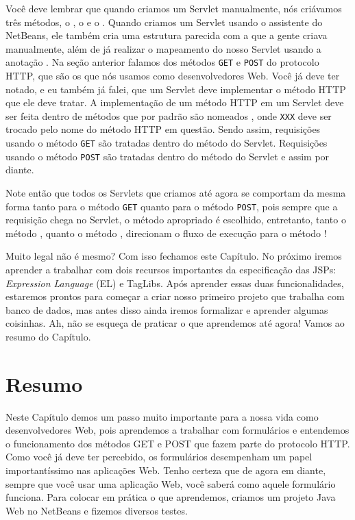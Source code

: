 Você deve lembrar que quando criamos um Servlet manualmente, nós criávamos três métodos, o , o  e o . Quando criamos um Servlet usando o assistente do NetBeans, ele também cria uma estrutura parecida com a que a gente criava manualmente, além de já realizar o mapeamento do nosso Servlet usando a anotação . Na seção anterior falamos dos métodos \texttt{GET} e \texttt{POST} do protocolo HTTP, que são os que nós usamos como desenvolvedores Web. Você já deve ter notado, e eu também já falei, que um Servlet deve implementar o método HTTP que ele deve tratar. A implementação de um método HTTP em um Servlet deve ser feita dentro de métodos que por padrão são nomeados , onde \texttt{XXX} deve ser trocado pelo nome do método HTTP em questão. Sendo assim, requisições usando o método \texttt{GET} são tratadas dentro do método  do Servlet. Requisições usando o método \texttt{POST} são tratadas dentro do método  do Servlet e assim por diante.

Note então que todos os Servlets que criamos até agora se comportam da mesma forma tanto para o método \texttt{GET} quanto para o método \texttt{POST}, pois sempre que a requisição chega no Servlet, o método apropriado é escolhido, entretanto, tanto o método , quanto o método , direcionam o fluxo de execução para o método !
 
Muito legal não é mesmo? Com isso fechamos este Capítulo. No próximo iremos aprender a trabalhar com dois recursos importantes da especificação das JSPs: \textit{Expression Language} (EL) e TagLibs. Após aprender essas duas funcionalidades, estaremos prontos para começar a criar nosso primeiro projeto que trabalha com banco de dados, mas antes disso ainda iremos formalizar e aprender algumas coisinhas. Ah, não se esqueça de praticar o que aprendemos até agora! Vamos ao resumo do Capítulo.


\section{Resumo}

Neste Capítulo demos um passo muito importante para a nossa vida como desenvolvedores Web, pois aprendemos a trabalhar com formulários e entendemos o funcionamento dos métodos GET e POST que fazem parte do protocolo HTTP. Como você já deve ter percebido, os formulários desempenham um papel importantíssimo nas aplicações Web. Tenho certeza que de agora em diante, sempre que você usar uma aplicação Web, você saberá como aquele formulário funciona. Para colocar em prática o que aprendemos, criamos um projeto Java Web no NetBeans e fizemos diversos testes.

